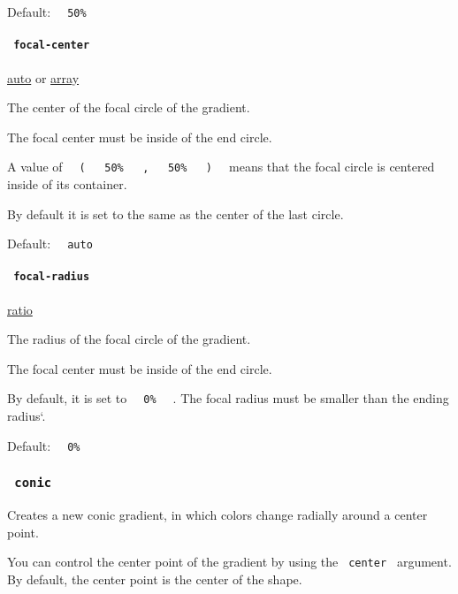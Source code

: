 Default: \texttt{\ }{\texttt{\ 50\%\ }}\texttt{\ }

\paragraph{\texorpdfstring{\texttt{\ focal-center\ }}{ focal-center }}\label{definitions-radial-focal-center}

\href{/docs/reference/foundations/auto/}{auto} {or}
\href{/docs/reference/foundations/array/}{array}

The center of the focal circle of the gradient.

The focal center must be inside of the end circle.

A value of
\texttt{\ }{\texttt{\ (\ }}\texttt{\ }{\texttt{\ 50\%\ }}\texttt{\ }{\texttt{\ ,\ }}\texttt{\ }{\texttt{\ 50\%\ }}\texttt{\ }{\texttt{\ )\ }}\texttt{\ }
means that the focal circle is centered inside of its container.

By default it is set to the same as the center of the last circle.

Default: \texttt{\ }{\texttt{\ auto\ }}\texttt{\ }

\paragraph{\texorpdfstring{\texttt{\ focal-radius\ }}{ focal-radius }}\label{definitions-radial-focal-radius}

\href{/docs/reference/layout/ratio/}{ratio}

The radius of the focal circle of the gradient.

The focal center must be inside of the end circle.

By default, it is set to \texttt{\ }{\texttt{\ 0\%\ }}\texttt{\ } . The
focal radius must be smaller than the ending radius`.

Default: \texttt{\ }{\texttt{\ 0\%\ }}\texttt{\ }

\subsubsection{\texorpdfstring{\texttt{\ conic\ }}{ conic }}\label{definitions-conic}

Creates a new conic gradient, in which colors change radially around a
center point.

You can control the center point of the gradient by using the
\texttt{\ center\ } argument. By default, the center point is the center
of the shape.

